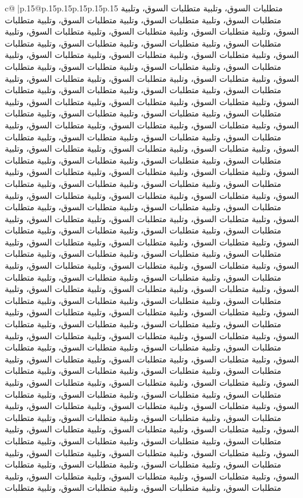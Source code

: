 \documentclass{article}
\begin{document}
{\begin{supertabular}{c@{$\;$}|p{.15\linewidth}@{}p{.15\linewidth}p{.15\linewidth}p{.15\linewidth}p{.15\linewidth}p{.15\linewidth}}
{{{متطلبات السوق، وتلبية متطلبات السوق، وتلبية متطلبات السوق، وتلبية متطلبات السوق، وتلبية متطلبات السوق، وتلبية متطلبات السوق، وتلبية متطلبات السوق، وتلبية متطلبات السوق، وتلبية متطلبات السوق، وتلبية متطلبات السوق، وتلبية متطلبات السوق، وتلبية متطلبات السوق، وتلبية متطلبات السوق، وتلبية متطلبات السوق، وتلبية متطلبات السوق، وتلبية متطلبات السوق، وتلبية متطلبات السوق، وتلبية متطلبات السوق، وتلبية متطلبات السوق، وتلبية متطلبات السوق، وتلبية متطلبات السوق، وتلبية متطلبات السوق، وتلبية متطلبات السوق، وتلبية متطلبات السوق، وتلبية متطلبات السوق، وتلبية متطلبات السوق، وتلبية متطلبات السوق، وتلبية متطلبات السوق، وتلبية متطلبات السوق، وتلبية متطلبات السوق، وتلبية متطلبات السوق، وتلبية متطلبات السوق، وتلبية متطلبات السوق، وتلبية متطلبات السوق، وتلبية متطلبات السوق، وتلبية متطلبات السوق، وتلبية متطلبات السوق، وتلبية متطلبات السوق، وتلبية متطلبات السوق، وتلبية متطلبات السوق، وتلبية متطلبات السوق، وتلبية متطلبات السوق، وتلبية متطلبات السوق، وتلبية متطلبات السوق، وتلبية متطلبات السوق، وتلبية متطلبات السوق، وتلبية متطلبات السوق، وتلبية متطلبات السوق، وتلبية متطلبات السوق، وتلبية متطلبات السوق، وتلبية متطلبات السوق، وتلبية متطلبات السوق، وتلبية متطلبات السوق، وتلبية متطلبات السوق، وتلبية متطلبات السوق، وتلبية متطلبات السوق، وتلبية متطلبات السوق، وتلبية متطلبات السوق، وتلبية متطلبات السوق، وتلبية متطلبات السوق، وتلبية متطلبات السوق، وتلبية متطلبات السوق، وتلبية متطلبات السوق، وتلبية متطلبات السوق، وتلبية متطلبات السوق، وتلبية متطلبات السوق، وتلبية متطلبات السوق، وتلبية متطلبات السوق، وتلبية متطلبات السوق، وتلبية متطلبات السوق، وتلبية متطلبات السوق، وتلبية متطلبات السوق، وتلبية متطلبات السوق، وتلبية متطلبات السوق، وتلبية متطلبات السوق، وتلبية متطلبات السوق، وتلبية متطلبات السوق، وتلبية متطلبات السوق، وتلبية متطلبات السوق، وتلبية متطلبات السوق، وتلبية متطلبات السوق، وتلبية متطلبات السوق، وتلبية متطلبات السوق، وتلبية متطلبات السوق، وتلبية متطلبات السوق، وتلبية متطلبات السوق، وتلبية متطلبات السوق، وتلبية متطلبات السوق، وتلبية متطلبات السوق، وتلبية متطلبات السوق، وتلبية متطلبات السوق، وتلبية متطلبات السوق، وتلبية متطلبات السوق، وتلبية متطلبات السوق، وتلبية متطلبات السوق، وتلبية متطلبات السوق، وتلبية متطلبات السوق، وتلبية متطلبات السوق، وتلبية متطلبات السوق، وتلبية متطلبات السوق، وتلبية متطلبات السوق، وتلبية متطلبات السوق، وتلبية متطلبات السوق، وتلبية متطلبات السوق، وتلبية متطلبات السوق، وتلبية متطلبات السوق، وتلبية متطلبات السوق، وتلبية متطلبات السوق، وتلبية متطلبات السوق، وتلبية متطلبات السوق، وتلبية متطلبات السوق، وتلبية متطلبات السوق، وتلبية متطلبات السوق، وتلبية متطلبات السوق، وتلبية متطلبات السوق، وتلبية متطلبات السوق، وتلبية متطلبات السوق، وتلبية متطلبات السوق، وتلبية متطلبات السوق، وتلبية متطلبات السوق، وتلبية متطلبات السوق، وتلبية متطلبات السوق، وتلبية متطلبات السوق، وتلبية متطلبات السوق، وتلبية متطلبات السوق، وتلبية متطلبات السوق، وتلبية متطلبات السوق، وتلبية متطلبات السوق، وتلبية متطلبات السوق، وتلبية متطلبات السوق، وتلبية متطلبات السوق، وتلبية متطلبات السوق، وتلبية متطلبات السوق، وتلبية متطلبات السوق، وتلبية متطلبات السوق، وتلبية متطلبات السوق، وتلبية متطلبات السوق، وتلبية متطلبات السوق، وتلبية متطلبات السوق، وتلبية متطلبات السوق، وتلبية متطلبات السوق، وتلبية متطلبات السوق، وتلبية متطلبات السوق، وتلبية متطلبات السوق، وتلبية متطلبات السوق، وتلبية متطلبات }}}
\end{supertabular}}
\end{document}
